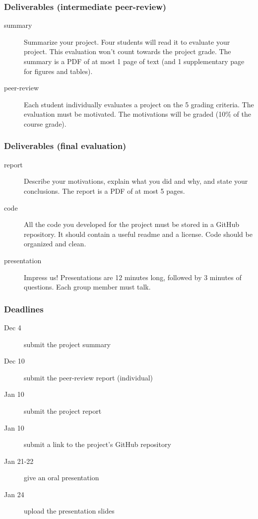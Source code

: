 \documentclass[aspectratio=169]{beamer}
\begin{document}
\begin{frame}
	\frametitle{Deliverables (intermediate peer-review)}
	\begin{description}
		\item[summary] Summarize your project. Four students will read it to evaluate your project. This evaluation won't count towards the project grade. The summary is a PDF of at most 1 page of text (and 1 supplementary page for figures and tables).
		\vfill
		\item[peer-review] Each student individually evaluates a project on the 5 grading criteria. The evaluation must be motivated. The motivations will be graded (10\% of the course grade).
	\end{description}
\end{frame}


\begin{frame}
	\frametitle{Deliverables (final evaluation)}
	\begin{description}
		\item [report] Describe your motivations, explain what you did and why, and state your conclusions. The report is a PDF of at most 5 pages.
		\vfill
		\item [code] All the code you developed for the project must be stored in a GitHub repository. It should contain a useful readme and a license. Code should be organized and clean.
		\vfill
		\item [presentation] Impress us! Presentations are 12 minutes long, followed by 3 minutes of questions. Each group member must talk.
	\end{description}
\end{frame}


\begin{frame}
	\frametitle{Deadlines}
	\begin{description}
		\item[Dec 4] submit the project summary
		\vfill
		\item[Dec 10] submit the peer-review report (individual)
		\vfill
		\item[Jan 10] submit the project report
		\vfill
		\item[Jan 10] submit a link to the project's GitHub repository
		\vfill
		\item[Jan 21-22] give an oral presentation
		\vfill
		\item[Jan 24] upload the presentation slides
	\end{description}
\end{frame}
\end{document}
